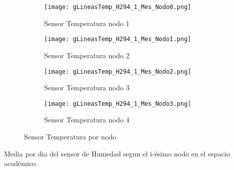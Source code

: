 \documentclass{article}
\begin{document}
        \begin{figure}[h!]
            \centering\begin{subfigure}[h]{0.42\linewidth}
                                    \texttt{[image: gLineasTemp\_H294\_1\_Mes\_Nodo0.png]}
                                    \caption{Sensor Temperatura nodo 1}
                                    \label{fig:Temp1}
                                \end{subfigure}
                                \begin{subfigure}[h]{0.42\linewidth}
                                    \texttt{[image: gLineasTemp\_H294\_1\_Mes\_Nodo1.png]}
                                    \caption{Sensor Temperatura nodo 2}
                                    \label{fig:Temp2}
                                \end{subfigure}
                                \begin{subfigure}[h]{0.42\linewidth}
                                    \texttt{[image: gLineasTemp\_H294\_1\_Mes\_Nodo2.png]}
                                    \caption{Sensor Temperatura nodo 3}
                                    \label{fig:Temp3}
                                \end{subfigure}
                                \begin{subfigure}[h]{0.42\linewidth}
                                    \texttt{[image: gLineasTemp\_H294\_1\_Mes\_Nodo3.png]}
                                    \caption{Sensor Temperatura nodo 4}
                                    \label{fig:Temp4}
                                \end{subfigure}
                                \caption{Sensor Temperatura por nodo}
		    \label{fig:fig1}
        \end{figure}
        \newpage
        Media por dia del sensor de Humedad segun el i-ésimo nodo en el espacio académico.
\end{document}
